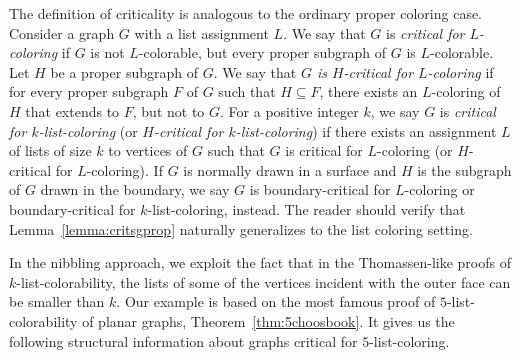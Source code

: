 \documentclass[12pt,twoside,openright,a4paper]{book}
\begin{document}
The definition of criticality is analogous to the ordinary proper coloring case.
Consider a graph $G$ with a list assignment $L$.  We say that $G$ is \emph{critical for $L$-coloring}
if $G$ is not $L$-colorable, but every proper subgraph of $G$ is $L$-colorable.
Let $H$ be a proper subgraph of $G$.
We say that \emph{$G$ is $H$-critical for $L$-coloring} if for every proper subgraph $F$
of $G$ such that $H\subseteq F$, there exists an $L$-coloring of $H$ that extends to $F$,
but not to $G$.  For a positive integer $k$, we say $G$ is \emph{critical for $k$-list-coloring} (or \emph{$H$-critical for $k$-list-coloring})
if there exists an assignment $L$ of lists of size $k$ to vertices of $G$ such that $G$ is critical
for $L$-coloring (or $H$-critical for $L$-coloring).  If $G$ is normally drawn in a surface and $H$ is the subgraph of $G$
drawn in the boundary, we say $G$ is boundary-critical for $L$-coloring or boundary-critical for $k$-list-coloring, instead.
The reader should verify that Lemma~\ref{lemma:critsgprop} naturally generalizes to the list coloring setting.

In the nibbling approach, we exploit the fact that in the Thomassen-like proofs of $k$-list-colorability,
the lists of some of the vertices incident with the outer face can be smaller than $k$. Our example
is based on the most famous proof of $5$-list-colorability of planar graphs,
Theorem~\ref{thm:5choosbook}.  It gives us the following structural information about graphs critical
for $5$-list-coloring.
\end{document}
